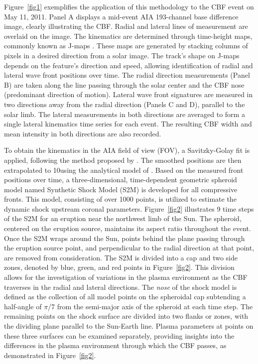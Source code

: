 Figure~\ref{fig1} exemplifies the application of this methodology to the CBF event on May 11, 2011. Panel A displays a mid-event AIA 193-channel base difference image, clearly illustrating the CBF. Radial and lateral lines of measurement are overlaid on the image. The kinematics are determined through time-height maps, commonly known as J-maps \citep{sheeley_1999}. These maps are generated by stacking columns of pixels in a desired direction from a solar image. The track's shape on J-maps depends on the feature's direction and speed, allowing identification of radial and lateral wave front positions over time. The radial direction measurements (Panel B) are taken along the line passing through the solar center and the CBF nose (predominant direction of motion). Lateral wave front signatures are measured in two directions away from the radial direction (Panels C and D), parallel to the solar limb. The lateral measurements in both directions are averaged to form a single lateral kinematics time series for each event. The resulting CBF width and mean intensity in both directions are also recorded.

To obtain the kinematics in the AIA field of view (FOV), a Savitzky-Golay fit is applied, following the method proposed by \citet{kozarev_2019}. The smoothed positions are then extrapolated to 10\rsun using the analytical model of \citet{byrne_2013}. Based on the measured front positions over time, a three-dimensional, time-dependent geometric spheroid model named Synthetic Shock Model (S2M) is developed for all compressive fronts. This model, consisting of over 1000 points, is utilized to estimate the dynamic shock upstream coronal parameters. Figure~\ref{fig2} illustrates 9 time steps of the S2M for an eruption near the northwest limb of the Sun.
The spheroid, centered on the eruption source, maintains its aspect ratio throughout the event. Once the S2M wraps around the Sun, points behind the plane passing through the eruption source point, and perpendicular to the radial direction at that point, are removed from consideration. The S2M is divided into a cap and two side zones, denoted by blue, green, and red points in Figure~\ref{fig2}. This division allows for the investigation of variations in the plasma environment as the CBF traverses in the radial and lateral directions.
The \textit{nose} of the shock model is defined as the collection of all model points on the spheroidal cap subtending a half-angle of $\pi$/7 from the semi-major axis of the spheroid at each time step. The remaining points on the shock surface are divided into two flanks or zones, with the dividing plane parallel to the Sun-Earth line. Plasma parameters at points on these three surfaces can be examined separately, providing insights into the differences in the plasma environment through which the CBF passes, as demonstrated in Figure~\ref{fig2}.






